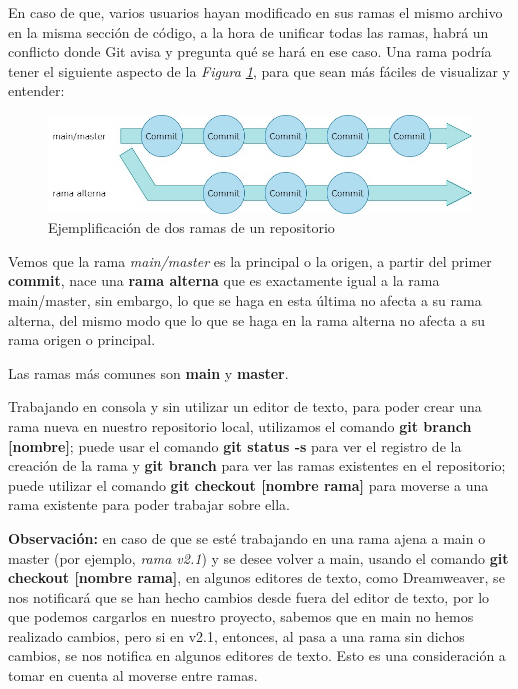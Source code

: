 En caso de que, varios usuarios hayan modificado en sus ramas el mismo archivo en la misma sección de código, a la hora de unificar todas las ramas, habrá un conflicto donde Git avisa y pregunta qué se hará en ese caso. Una rama podría tener el siguiente aspecto de la \textit{Figura \ref{fig: 3}}, para que sean más fáciles de visualizar y entender:
\begin{figure}[H]
    \centering
    \caption{Ejemplificación de dos ramas de un repositorio}
    \label{fig: 3}
    \includegraphics[width=\textwidth]{conceptos/g3.jpg}
\end{figure}

Vemos que la rama \textit{main/master} es la principal o la origen, a partir del primer \textbf{commit}, nace una \textbf{rama alterna} que es exactamente igual a la rama main/master, sin embargo, lo que se haga en esta última no afecta a su rama alterna, del mismo modo que lo que se haga en la rama alterna no afecta a su rama origen o principal.

Las ramas más comunes son \textbf{main} y \textbf{master}.

Trabajando en consola y sin utilizar un editor de texto, para poder crear una rama nueva en nuestro repositorio local, utilizamos el comando \textbf{git branch [nombre]}; puede usar el comando \textbf{git status -s} para ver el registro de la creación de la rama y \textbf{git branch} para ver las ramas existentes en el repositorio; puede utilizar el comando \textbf{git checkout [nombre rama]} para moverse a una rama existente para poder trabajar sobre ella.

\textbf{Observación:} en caso de que se esté trabajando en una rama ajena a main o master (por ejemplo, \textit{rama v2.1}) y se desee volver a main, usando el comando \textbf{git checkout [nombre rama]}, en algunos editores de texto, como Dreamweaver, se nos notificará que se han hecho cambios desde fuera del editor de texto, por lo que podemos cargarlos en nuestro proyecto, sabemos que en main no hemos realizado cambios, pero si en v2.1, entonces, al pasa a una rama sin dichos cambios, se nos notifica en algunos editores de texto. Esto es una consideración a tomar en cuenta al moverse entre ramas.

